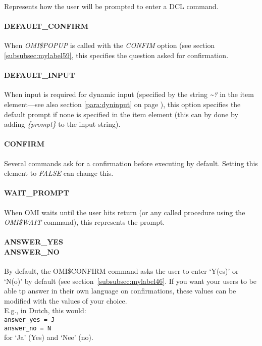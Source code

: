 \documentclass[a4paper]{book}
\renewcommand{\indent}{\hspace*{5mm}}
\begin{document}
Represents how the user will be prompted to enter a DCL command.

\paragraph{DEFAULT{\_}CONFIRM}\label{para:defconfirm}

When \textsl{OMI{\$}POPUP} is called with the \textsl{CONFIM} option (see section \ref{subsubsec:mylabel59}, this specifies the question asked for confirmation.

\paragraph{DEFAULT{\_}INPUT}

When input is required for dynamic input (specified by the string \textsl{\~{}?} in the item 
element---see also section \ref{para:dyninput} on page \pageref{para:dyninput}),
this option specifies the default prompt if none is specified in 
the item element (this can by done by adding \textsl{{\{}\textit{prompt}{\}}} to the input string).

\paragraph{CONFIRM}
\label{para:confirmput}

Several commands ask for a confirmation
before executing by default. Setting this element to \textsl{FALSE} can change this.

\paragraph{WAIT{\_}PROMPT}

When OMI waits until the user hits return (or any called procedure using the 
\textsl{OMI{\$}WAIT} command), this 
represents the prompt.

\paragraph{ANSWER{\_}YES\\ANSWER{\_}NO}

By default, the \textsf{OMI{\$}CONFIRM} command asks the user to enter `Y(es)' or `N(o)' by
default (see section~\ref{subsubsec:mylabel46}. If you want your users to be able tp
answer in their own language on confirmations, these values can be modified with the
values of your choice.\\
E.g., in Dutch, this would: \\
\indent\texttt{answer{\_}yes = J}\\
\indent\texttt{answer{\_}no = N}\\
for `Ja' (Yes) and `Nee' (no).
\end{document}
